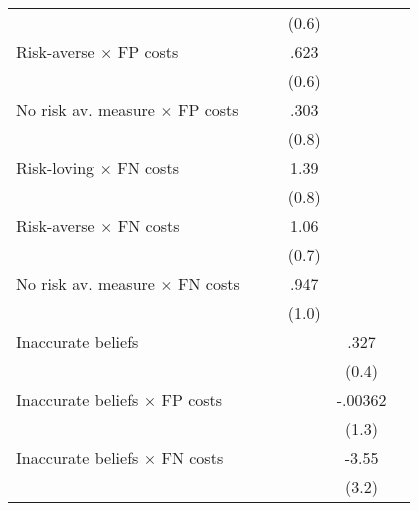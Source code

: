 \begin{table}[htbp]
\begin{tabular}{l*{5}{c}}
                &                  &                  &    (0.6)         &                  &                  \\
Risk-averse $\times$ FP costs&                  &                  &     .623         &                  &                  \\
                &                  &                  &    (0.6)         &                  &                  \\
No risk av. measure $\times$ FP costs&                  &                  &     .303         &                  &                  \\
                &                  &                  &    (0.8)         &                  &                  \\
Risk-loving $\times$ FN costs&                  &                  &     1.39\sym{*}  &                  &                  \\
                &                  &                  &    (0.8)         &                  &                  \\
Risk-averse $\times$ FN costs&                  &                  &     1.06         &                  &                  \\
                &                  &                  &    (0.7)         &                  &                  \\
No risk av. measure $\times$ FN costs&                  &                  &     .947         &                  &                  \\
                &                  &                  &    (1.0)         &                  &                  \\
Inaccurate beliefs&                  &                  &                  &     .327         &                  \\
                &                  &                  &                  &    (0.4)         &                  \\
Inaccurate beliefs $\times$ FP costs&                  &                  &                  &  -.00362         &                  \\
                &                  &                  &                  &    (1.3)         &                  \\
Inaccurate beliefs $\times$ FN costs&                  &                  &                  &    -3.55         &                  \\
                &                  &                  &                  &    (3.2)         &                  \\

\end{tabular}
\end{table}
